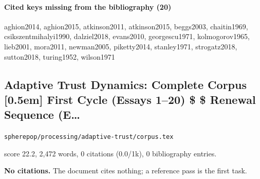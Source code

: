 \documentclass[11pt]{article}
\newcommand{\loc}[1]{{\small\color{muted}\texttt{#1}}}
\begin{document}
\paragraph{Cited keys missing from the bibliography (20)}
{\small\ttfamily\raggedright aghion2014, aghion2015, atkinson2011, atkinson2015, beggs2003, chaitin1969, csikszentmihalyi1990, dalziel2018, evans2010, georgescu1971, kolmogorov1965, lieb2001, mora2011, newman2005, piketty2014, stanley1971, strogatz2018, sutton2018, turing1952, wilson1971\par}
\subsection{Adaptive Trust Dynamics: Complete Corpus [0.5em] First Cycle (Essays 1--20) \$ \$ Renewal Sequence (E\ldots{}}
\loc{spherepop/\allowbreak{}processing/\allowbreak{}adaptive-trust/\allowbreak{}corpus.tex}\par
score 22.2, 2,472 words, 0 citations (0.0/1k), 0 bibliography entries.

\textbf{No citations.} The document cites nothing; a reference pass is the first task.
\end{document}
